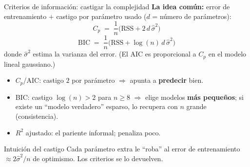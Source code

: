 \documentclass{beamer}
\newcommand{\1}{\mathbb{I}}
\newcommand{\RSS}{\mathrm{RSS}}
\begin{document}
\begin{frame}{Criterios de información: castigar la complejidad}
\small
\textbf{La idea común:} error de entrenamiento $+$ castigo por parámetro usado ($d$ = número de parámetros):
\pause
\[ C_p \;=\; \frac{1}{n}\big( \RSS + 2\,d\,\hat{\sigma}^2 \big) \]
\[ \mathrm{BIC} \;=\; \frac{1}{n}\big( \RSS + \log(n)\,d\,\hat{\sigma}^2 \big) \]
donde $\hat{\sigma}^2$ estima la varianza del error. (El AIC es proporcional a $C_p$ en el modelo lineal gaussiano.)
\pause

\vspace{0.2cm}
\begin{itemize}\itemsep4pt
  \item $C_p$/AIC: castigo $2$ por parámetro $\Rightarrow$ apunta a \textbf{predecir} bien.
  \item BIC: castigo $\log(n) > 2$ para $n \geq 8$ $\Rightarrow$ elige modelos \textbf{más pequeños}; si existe un ``modelo verdadero'' esparso, lo recupera con $n$ grande (consistencia).
  \item $R^2$ ajustado: el pariente informal; penaliza poco.
\end{itemize}
\pause

\begin{block}{Intuición del castigo}
Cada parámetro extra le ``roba'' al error de entrenamiento $\approx 2\hat{\sigma}^2/n$ de optimismo. Los criterios se lo devuelven.
\end{block}
\end{frame}
\end{document}
